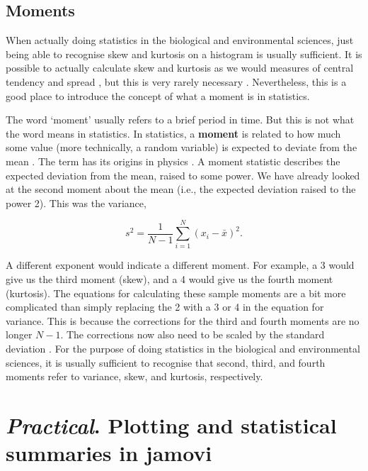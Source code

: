 \documentclass[
]{scrbook}
\begin{document}
\hypertarget{moments}{%
\section{Moments}\label{moments}}

When actually doing statistics in the biological and environmental sciences, just being able to recognise skew and kurtosis on a histogram is usually sufficient.
It is possible to actually calculate skew and kurtosis as we would measures of central tendency and spread \citep{Rahman1968, Groeneveld1984, Sokal1995}, but this is very rarely necessary \citep[but see][]{Doane2011}.
Nevertheless, this is a good place to introduce the concept of what a moment is in statistics.

The word `moment' usually refers to a brief period in time.
But this is not what the word means in statistics.
In statistics, a \textbf{moment} is related to how much some value (more technically, a random variable) is expected to deviate from the mean \citep{Upton2014}.
The term has its origins in physics \citep{Sokal1995, Miller2004}.
A moment statistic describes the expected deviation from the mean, raised to some power.
We have already looked at the second moment about the mean (i.e., the expected deviation raised to the power 2).
This was the variance,

\[s^{2} = \frac{1}{N - 1}\sum_{i = 1}^{N}\left(x_{i} - \bar{x} \right)^{2}.\]

A different exponent would indicate a different moment.
For example, a 3 would give us the third moment (skew), and a 4 would give us the fourth moment (kurtosis).
The equations for calculating these sample moments are a bit more complicated than simply replacing the 2 with a 3 or 4 in the equation for variance.
This is because the corrections for the third and fourth moments are no longer \(N - 1\).
The corrections now also need to be scaled by the standard deviation \citep[for details, see][]{Sokal1995}.
For the purpose of doing statistics in the biological and environmental sciences, it is usually sufficient to recognise that second, third, and fourth moments refer to variance, skew, and kurtosis, respectively.

\hypertarget{Chapter_14}{%
\chapter{\texorpdfstring{\emph{Practical}. Plotting and statistical summaries in jamovi}{Practical. Plotting and statistical summaries in jamovi}}\label{Chapter_14}}
\end{document}
